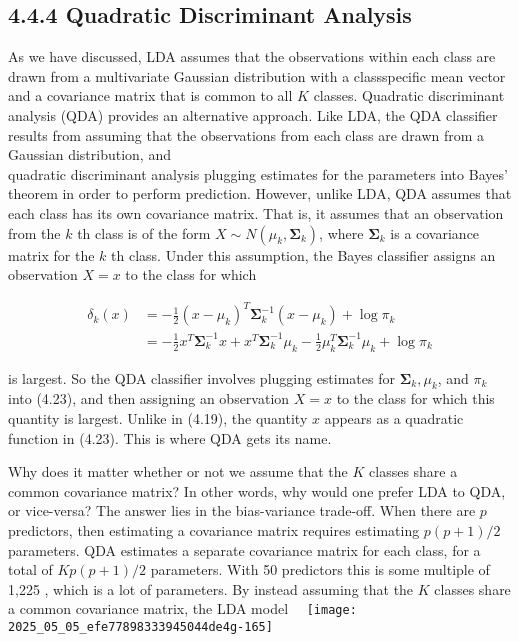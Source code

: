 \documentclass[10pt]{article}
\begin{document}
\subsection*{4.4.4 Quadratic Discriminant Analysis}
As we have discussed, LDA assumes that the observations within each class are drawn from a multivariate Gaussian distribution with a classspecific mean vector and a covariance matrix that is common to all $K$ classes. Quadratic discriminant analysis (QDA) provides an alternative approach. Like LDA, the QDA classifier results from assuming that the observations from each class are drawn from a Gaussian distribution, and\\
quadratic discriminant analysis plugging estimates for the parameters into Bayes' theorem in order to perform prediction. However, unlike LDA, QDA assumes that each class has its own covariance matrix. That is, it assumes that an observation from the $k$ th class is of the form $X \sim N\left(\mu_{k}, \boldsymbol{\Sigma}_{k}\right)$, where $\boldsymbol{\Sigma}_{k}$ is a covariance matrix for the $k$ th class. Under this assumption, the Bayes classifier assigns an observation $X=x$ to the class for which


\begin{align*}
\delta_{k}(x) & =-\frac{1}{2}\left(x-\mu_{k}\right)^{T} \boldsymbol{\Sigma}_{k}^{-1}\left(x-\mu_{k}\right)+\log \pi_{k} \\
& =-\frac{1}{2} x^{T} \boldsymbol{\Sigma}_{k}^{-1} x+x^{T} \boldsymbol{\Sigma}_{k}^{-1} \mu_{k}-\frac{1}{2} \mu_{k}^{T} \boldsymbol{\Sigma}_{k}^{-1} \mu_{k}+\log \pi_{k} \tag{4.23}
\end{align*}


is largest. So the QDA classifier involves plugging estimates for $\boldsymbol{\Sigma}_{k}, \mu_{k}$, and $\pi_{k}$ into (4.23), and then assigning an observation $X=x$ to the class for which this quantity is largest. Unlike in (4.19), the quantity $x$ appears as a quadratic function in (4.23). This is where QDA gets its name.

Why does it matter whether or not we assume that the $K$ classes share a common covariance matrix? In other words, why would one prefer LDA to QDA, or vice-versa? The answer lies in the bias-variance trade-off. When there are $p$ predictors, then estimating a covariance matrix requires estimating $p(p+1) / 2$ parameters. QDA estimates a separate covariance matrix for each class, for a total of $K p(p+1) / 2$ parameters. With 50 predictors this is some multiple of 1,225 , which is a lot of parameters. By instead assuming that the $K$ classes share a common covariance matrix, the LDA model\
\
\texttt{[image: 2025\_05\_05\_efe77898333945044de4g-165]}
\end{document}
